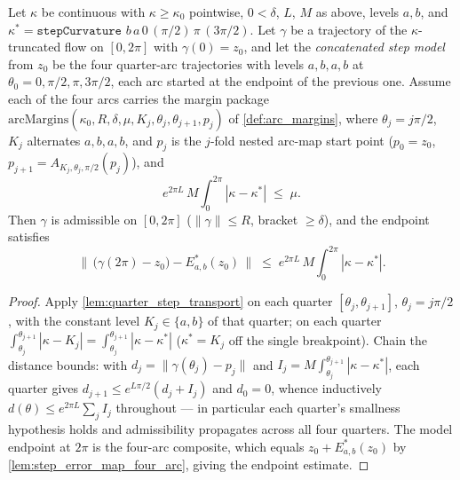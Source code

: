 \begin{lemma}
  \label{lem:step_model_transport}
  Let $\kappa$ be continuous with $\kappa\ge\kappa_0$ pointwise, $0<\delta$, $L$, $M$ as
  above, levels $a,b$, and $\kappa^\ast=\texttt{stepCurvature } b\,a\,0\,(\pi/2)\,\pi\,
  (3\pi/2)$. Let $\gamma$ be a trajectory of the $\kappa$-truncated flow on $[0,2\pi]$ with
  $\gamma(0)=z_0$, and let the \emph{concatenated step model} from $z_0$ be the four
  quarter-arc trajectories with levels $a,b,a,b$ at $\theta_0=0,\pi/2,\pi,3\pi/2$, each
  arc started at the endpoint of the previous one. Assume each of the four arcs
  carries the margin package
  $\mathrm{arcMargins}(\kappa_0,R,\delta,\mu,K_j,\theta_j,\theta_{j+1},p_j)$ of
  \cref{def:arc_margins}, where $\theta_j=j\pi/2$, $K_j$ alternates $a,b,a,b$, and
  $p_j$ is the $j$-fold nested arc-map start point ($p_0=z_0$,
  $p_{j+1}=A_{K_j,\theta_j,\pi/2}(p_j)$), and
  \[
    e^{2\pi L}\,M\!\int_0^{2\pi}\!|\kappa-\kappa^\ast|\;\le\;\mu .
  \]
  Then $\gamma$ is admissible on $[0,2\pi]$ ($\|\gamma\|\le R$, bracket $\ge\delta$), and the
  endpoint satisfies
  \[
    \bigl\|\,\bigl(\gamma(2\pi)-z_0\bigr)-E^\ast_{a,b}(z_0)\,\bigr\|
    \;\le\;e^{2\pi L}\,M\!\int_0^{2\pi}\!|\kappa-\kappa^\ast| .
  \]
\end{lemma}

\begin{proof}
  \leanok
  Apply \cref{lem:quarter_step_transport} on each quarter $[\theta_j,\theta_{j+1}]$,
  $\theta_j=j\pi/2$, with the constant level $K_j\in\{a,b\}$ of that quarter; on each
  quarter $\int_{\theta_j}^{\theta_{j+1}}|\kappa-K_j|=\int_{\theta_j}^{\theta_{j+1}}
  |\kappa-\kappa^\ast|$ ($\kappa^\ast=K_j$ off the single breakpoint). Chain the distance
  bounds: with $d_j=\|\gamma(\theta_j)-p_j\|$ and $I_j=M\int_{\theta_j}^{
  \theta_{j+1}}|\kappa-\kappa^\ast|$, each quarter gives $d_{j+1}\le e^{L\pi/2}(d_j+I_j)$
  and $d_0=0$, whence inductively $d(\theta)\le e^{2\pi L}\sum_j I_j$ throughout —
  in particular each quarter's smallness hypothesis holds and admissibility propagates
  across all four quarters. The model endpoint at $2\pi$ is the four-arc composite,
  which equals $z_0+E^\ast_{a,b}(z_0)$ by \cref{lem:step_error_map_four_arc}, giving
  the endpoint estimate.
\end{proof}

